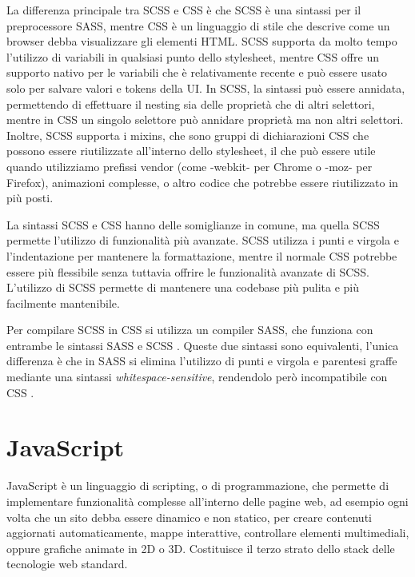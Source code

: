 La differenza principale tra SCSS e CSS è che SCSS è una sintassi per il preprocessore SASS, mentre CSS è un linguaggio di stile che descrive come un browser debba visualizzare gli elementi HTML. SCSS supporta da molto tempo l'utilizzo di variabili in qualsiasi punto dello stylesheet, mentre CSS offre un supporto nativo per le variabili che è relativamente recente e può essere usato solo per salvare valori e tokens della UI. In SCSS, la sintassi può essere annidata, permettendo di effettuare il nesting sia delle proprietà che di altri selettori, mentre in CSS un singolo selettore può annidare proprietà ma non altri selettori. Inoltre, SCSS supporta i mixins, che sono gruppi di dichiarazioni CSS che possono essere riutilizzate all'interno dello stylesheet, il che può essere utile quando utilizziamo prefissi vendor (come -webkit- per Chrome o -moz- per Firefox), animazioni complesse, o altro codice che potrebbe essere riutilizzato in più posti.

La sintassi SCSS e CSS hanno delle somiglianze in comune, ma quella SCSS permette l'utilizzo di funzionalità più avanzate. SCSS utilizza i punti e virgola e l'indentazione per mantenere la formattazione, mentre il normale CSS potrebbe essere più flessibile senza tuttavia offrire le funzionalità avanzate di SCSS. L'utilizzo di SCSS permette di mantenere una codebase più pulita e più facilmente mantenibile.

Per compilare SCSS in CSS si utilizza un compiler SASS, che funziona con entrambe le sintassi SASS e SCSS \cite{SCSS}. Queste due sintassi sono equivalenti, l'unica differenza è che in SASS si elimina l'utilizzo di punti e virgola e parentesi graffe mediante una sintassi \textit{whitespace-sensitive}, rendendolo però incompatibile con CSS \cite{SASS}.

\section{JavaScript}
JavaScript è un linguaggio di scripting, o di programmazione, che permette di implementare funzionalità complesse all'interno delle pagine web, ad esempio ogni volta che un sito debba essere dinamico e non statico, per creare contenuti aggiornati automaticamente, mappe interattive, controllare elementi multimediali, oppure grafiche animate in 2D o 3D. Costituisce il terzo strato dello stack delle tecnologie web standard.

